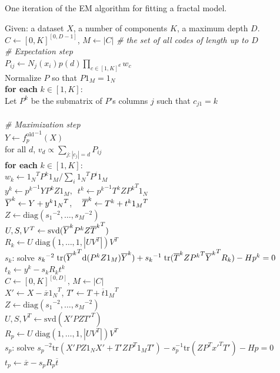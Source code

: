 \begin{pseudo}[th]
\caption{One iteration of the EM algorithm for fitting a fractal model.}
{
Given: a dataset $X$, a number of components $K$, a maximum depth $D$. \\

$C \leftarrow [0,K]^{[0, D-1]}$, $M \leftarrow |C|$ \emph{\# the set of all codes of length up to $D$} \\
\emph{\# Expectation step}\\
$P_{ij} \leftarrow N_j(x_i) p(d) \prod_{c \in [1,K]^d} w_c$  \\ 
Normalize $P$ so that $P1_M = 1_N$ \\
\textbf{for each} $k \in [1,K]$: \\
\tab Let $P^k$ be the submatrix of $P$'s columns $j$ such that $c_{j1} = k$\\
\\
\emph{\# Maximization step} \\
$Y \leftarrow {f^\text{old}_p}^{-1}(X)$\\
for all $d$, $v_d \propto \sum_{j : |c_j| = d} P_{ij} $\\
\textbf{for each} $k \in [1,K]$: \\
\tab $w_k \leftarrow {1_N}^T P^k 1_M / \sum_i {{1_N}^T P^i 1_M}$\\
\tab $y^k \leftarrow {p^k}^{-1}YP^kZ1_M, \,\,\, t^k \leftarrow {p^k}^{-1} T^kZ{P^k}^T 1_N$\\
\tab $\overline{Y}^k \leftarrow Y + y^k{1_N}^T$, \,\,\, $\overline{T}^k \leftarrow T^k + t^k{1_M}^T$\\
\tab $Z \leftarrow \text{diag}({s_1}^{-2}, \ldots, {s_M}^{-2})$\\
\tab $U,S,V^T \leftarrow \text{svd}(\overline{Y}^kP^kZ{\overline{T}^k}^T)$\\ 
\tab $R_k \leftarrow U\;\text{diag}(1,\ldots,1,|UV^T|) V^T$ \\
\tab $s_k$: solve ${s_k}^{-2}\; \text{tr}({\overline{Y}^k}^T\text{d}(P^kZ1_M)\overline{Y}^k) + {s_k}^{-1}\;\text{tr}(\overline{T}^kZ{P^k}^T{\overline{Y}^k}^TR_k) - Hp^k= 0$ \\
\tab $t_k \leftarrow y^k - s_k R_k t^k$ \\

$C \leftarrow [0,K]^{[0, D]}$, $M \leftarrow |C|$\\
$X' \leftarrow X - \overline{x}{1_N}^T$, $T' \leftarrow T + \overline{t}{1_M}^T$\\
\tab $Z \leftarrow \text{diag}({s_1}^{-2}, \ldots, {s_M}^{-2})$\\
$U,S,V^T \leftarrow \text{svd}(X'PZ{T'}^T)$\\ 
$R_p \leftarrow U\;\text{diag}(1,\ldots,1,|UV^T|) V^T$ \\
$s_p$: solve ${s_p}^{-2}\text{tr}(X'PZ1_NX'+ T'Z{P}^T1_MT') - s_p^{-1} \text{tr}(ZP^T{x'}^TT') -Hp = 0$ \\
$t_p \leftarrow \overline{x} - s_pR_p\overline{t}$ \\
}
\end{pseudo}

